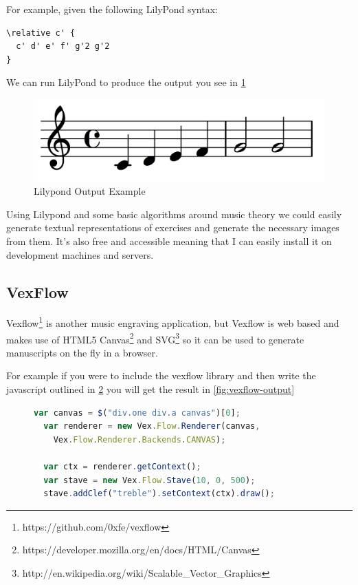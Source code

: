For example, given the following LilyPond syntax:

\begin{lstlisting}
\relative c' {
  c' d' e' f' g'2 g'2
}
\end{lstlisting}

We can run LilyPond to produce the output you see in \cref{fig:lilypond-output}

\begin{figure}[h!]
  \includegraphics[width=\linewidth]{gfx/background/lilypond-output.png}
  \centering
  \caption{Lilypond Output Example}
  \label{fig:lilypond-output}
\end{figure}

Using Lilypond and some basic algorithms around music theory we could easily generate textual representations of exercises and generate the necessary images from them. It's also free and accessible meaning that I can easily install it on development machines and servers.

\subsection{VexFlow}

Vexflow\footnote{https://github.com/0xfe/vexflow} is another music engraving application, but Vexflow is web based and makes use of HTML5 Canvas\footnote{https://developer.mozilla.org/en/docs/HTML/Canvas} and SVG\footnote{http://en.wikipedia.org/wiki/Scalable\_Vector\_Graphics} so it can be used to generate manuscripts on the fly in a browser.

For example if you were to include the vexflow library and then write the javascript outlined in \cref{lst:vexflow} you will get the result in \cref{fig:vexflow-output}

\begin{figure}[h!]
  \begin{lstlisting}[language=JavaScript]
  var canvas = $("div.one div.a canvas")[0];
  var renderer = new Vex.Flow.Renderer(canvas,
    Vex.Flow.Renderer.Backends.CANVAS);

  var ctx = renderer.getContext();
  var stave = new Vex.Flow.Stave(10, 0, 500);
  stave.addClef("treble").setContext(ctx).draw();
  \end{lstlisting}
  \label{lst:vexflow}
\end{figure}

